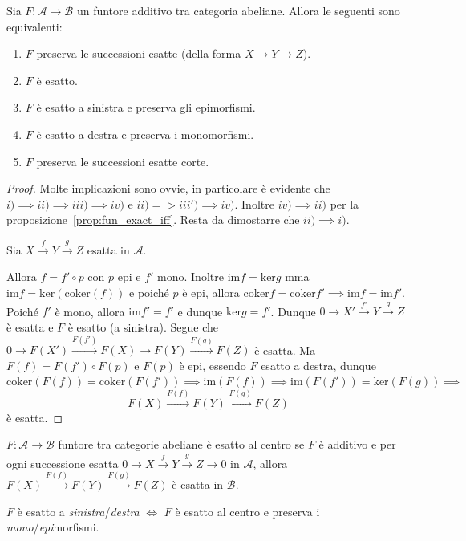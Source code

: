 \begin{proposition}{}
    Sia \(F : \mathcal{A} \to \mathcal{B}\) un funtore additivo tra categoria
    abeliane. Allora le seguenti sono equivalenti:
\begin{enumerate}[label = \roman*)]
    \item \(F\) preserva le successioni esatte (della forma \(X \to Y \to Z\)).
    \item \(F\) è esatto.
    \item \(F\) è esatto a sinistra e preserva gli epimorfismi.
    \item[iii')] \(F\) è esatto a destra e preserva i monomorfismi.
    \item \(F\) preserva le successioni esatte corte.
\end{enumerate}
\end{proposition}
\begin{proof}{}
    Molte implicazioni sono ovvie, in particolare è evidente che \(i) \implies ii) \implies iii) \implies iv)\) e \(ii) => iii') \implies iv)\). Inoltre \(iv) \implies ii)\) per la proposizione~\ref{prop:fun_exact_iff}.
    Resta da dimostarre che \(ii) \implies i)\).

    Sia \(X \overset{f}{\to } Y \overset{g}{\to } Z\) esatta in \(\mathcal{A}\).

    Allora \(f = f' \circ p\) con \(p\) epi e \(f'\) mono. Inoltre \(\mathrm{im}f = \mathrm{ker}g\) mma \(\mathrm{im}f = \mathrm{ker}{(\mathrm{coker}{(f)})}\) e poiché \(p\) è epi, allora \(\mathrm{coker}f = \mathrm{coker}f' \implies \mathrm{im}f = \mathrm{im}f'\).
    Poiché \(f'\) è mono, allora \(\mathrm{im}f' = f'\) e dunque \(\mathrm{ker}g = f'\). Dunque \(0 \to X' \overset{f'}{\to } Y \overset{g}{\to } Z\) è esatta e \(F\) è esatto (a sinistra). Segue che \(0 \to F{(X')} \overset{F{(f')}}{\to } F{(X)} \to F{(Y)} \overset{F{(g)}}{\to } F{(Z)}\) è esatta. Ma \(
    F{(f)} = F{(f')} \circ F{(p)}\) e \(F{(p)}\) è epi, essendo \(F\) esatto a
    destra, dunque \(\mathrm{coker}{(F{(f)})} = \mathrm{coker}{(F{(f')})} \implies \mathrm{im}{(F{(f)})} \implies \mathrm{im}{(F{(f')})} = \mathrm{ker}{(F{(g)})} \implies \) 
    \[
      F{(X)} \overset{F{(f)}}{\to } F{(Y)} \overset{F{(g)}}{\to } F{(Z)}
    \]
    è esatta.
\end{proof}

\begin{definition}{}
    \(F: \mathcal{A} \to \mathcal{B}\) funtore tra categorie abeliane è esatto
    al centro se \(F\) è additivo e per ogni successione esatta \(0 \to X\overset{f}{\to} Y \overset{g}{\to} Z \to 0\) in \(\mathcal{A}\), allora \(F{(X)} \overset{F{(f)}}{\to} F{(Y)} \overset{F{(g)}}{\to} F{(Z)}\) è esatta in \(\mathcal{B}\).
\end{definition}
\begin{corollary}{}
    \(F\) è esatto a \emph{sinistra}/\emph{destra} \(\iff\) \(F\) è esatto al
    centro e preserva i \emph{mono}/\emph{epi}morfismi.
\end{corollary}

